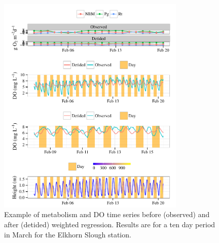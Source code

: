 \documentclass[letterpaper,12pt,oneside]{article}\usepackage[]{graphicx}\usepackage[]{color}
\newenvironment{knitrout}{}{} %
\begin{document}
\centering\vspace*{\fill}
\begin{knitrout}
\color{fgcolor}\begin{figure}[!ht]


{\centering \includegraphics[width=0.8\textwidth]{figure/case_ex2} 

}

\caption[Example of metabolism and \ac{DO} time series before (observed) and after (detided) weighted regression]{Example of metabolism and \ac{DO} time series before (observed) and after (detided) weighted regression. Results are for a ten day period in March for the Elkhorn Slough station.\label{fig:case_ex2}}
\end{figure}


\end{knitrout}
\vfill
\clearpage
\end{document}
